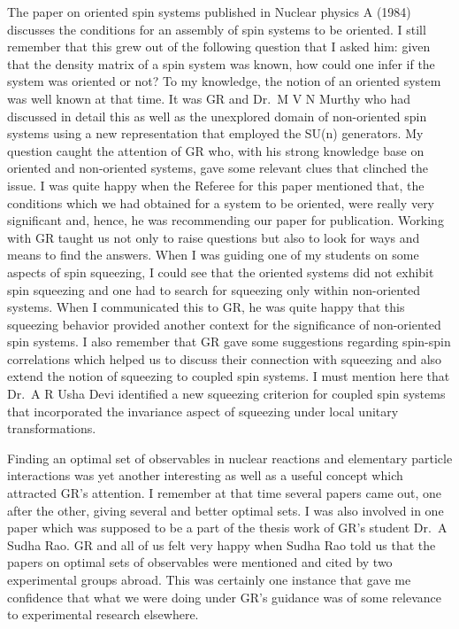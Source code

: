 The paper on oriented spin systems published in Nuclear physics A (1984) discusses the conditions for an assembly of spin systems to be oriented. I still remember that this grew out of the following question that I asked him: given that the density matrix of a spin system was known, how could one infer if the system was oriented or not? To my knowledge, the notion of an oriented system was well known at that time. It was GR and Dr.\ M V N Murthy who had discussed in detail this as well as the unexplored domain of non-oriented spin systems using a new representation that employed the SU(n) generators. My question caught the attention of GR who, with his strong knowledge base on oriented and non-oriented systems, gave some relevant clues that clinched the issue. I was quite happy when the Referee for this paper mentioned that, the conditions which we had obtained for a system to be oriented, were really very significant and, hence, he was recommending our paper for publication. Working with GR taught us not only to raise questions but also to look for ways and means to find the answers. When I was guiding one of my students on some aspects of spin squeezing, I could see that the oriented systems did not exhibit spin squeezing and one had to search for squeezing only within non-oriented systems. When I communicated this to GR, he was quite happy that this squeezing behavior provided another context for the significance of non-oriented spin systems. I also remember that GR gave some suggestions regarding spin-spin correlations which helped us to discuss their connection with squeezing and also extend the notion of squeezing to coupled spin systems. I must mention here that Dr.\ A R Usha Devi identified a new squeezing criterion for coupled spin systems that incorporated the invariance aspect of squeezing under local unitary transformations.
\newpage

Finding an optimal set of observables in nuclear reactions and elementary particle interactions was yet another interesting as well as a useful concept which attracted GR's attention. I remember at that time several papers came out, one after the other, giving several and better optimal sets. I was also involved in one paper which was supposed to be a part of the thesis work of GR's student Dr.\ A Sudha Rao. GR and all of us felt very happy when Sudha Rao told us that the papers on optimal sets of observables were mentioned and cited by two experimental groups abroad. This was certainly one instance that gave me confidence that what we were doing under GR's guidance was of some relevance to experimental research elsewhere.

